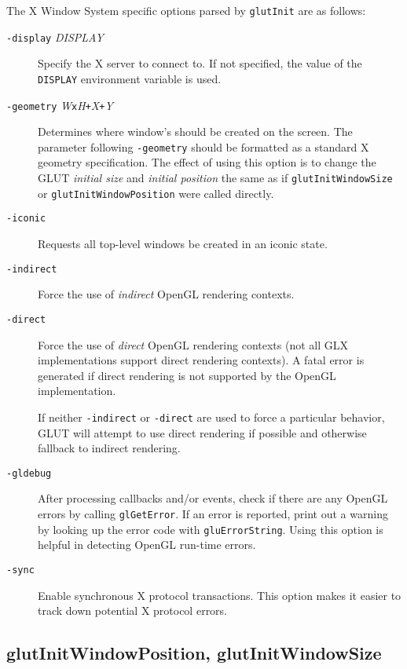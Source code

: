The X Window System specific options parsed by {\tt glutInit} are as follows:
\begin{description}
\item[{\tt -display} {\em DISPLAY}]
Specify the X server to connect to.  If not specified, the
value of the {\tt DISPLAY} environment variable is used.

\item[{{\tt -geometry} {\em W}{\tt x}{\em H}{\tt +}{\em X}{\tt +}{\em Y}}]
Determines where window's should be created on the screen.  The
parameter following {\tt -geometry} should be formatted as a standard X geometry specification.
The effect of using this option is to change the GLUT
{\em initial size} and {\em initial position} the same as if
{\tt glutInitWindowSize} or {\tt glutInitWindowPosition}
were called directly.

\item[{\tt -iconic}]
Requests all top-level windows be created in an iconic state.

\item[{\tt -indirect}]
Force the use of {\em indirect} OpenGL rendering contexts.

\item[{\tt -direct}]
Force the use of {\em direct}
OpenGL rendering contexts (not all GLX implementations support
direct rendering contexts).  A fatal error is generated if direct
rendering is not supported by the OpenGL implementation.

If neither {\tt -indirect} or {\tt -direct} are used to force
a particular behavior, GLUT will attempt to use direct rendering
if possible and otherwise fallback to indirect rendering.

\item[{\tt -gldebug}]
After processing callbacks and/or events, check if there are any OpenGL
errors by calling {\tt glGetError}.  If an error is reported, print out
a warning by looking up the error code with {\tt gluErrorString}.  Using
this option is helpful in detecting  OpenGL run-time errors.

\item[{\tt -sync}]
Enable synchronous X protocol transactions.  This option makes it easier
to track down potential  X protocol errors.

\end{description}

\subsection{glutInitWindowPosition, glutInitWindowSize}

